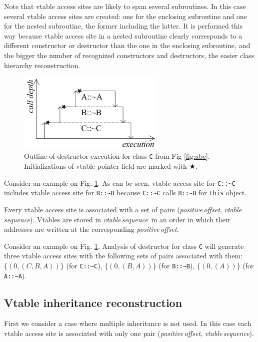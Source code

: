 \documentclass[times, 10pt,twocolumn]{article}
\newcommand{\offset}{\textit{offset}}
\newcommand{\vtable}{\textit{vtable}}
\newcommand{\positive}{\textit{positive}}
\newcommand{\sequence}{\textit{sequence}}
\renewcommand{\~}{{\raise.35ex\hbox{$\scriptstyle\sim$}}}
\begin{document}
Note that vtable access sites are likely to span several subroutines. In this
case several vtable access sites are created: one for the
enclosing subroutine and one for the nested subroutine, the former including the latter.
It is performed this way because vtable access site in a nested
subroutine clearly corresponds to a different constructor or destructor than the one
in the enclosing subroutine, 
and the bigger the number of recognized constructors and destructors, the easier class
hierarchy reconstruction.

\begin{figure}[tb!]
\centering
  \includegraphics[width=7.0cm]{images/dtor}
\caption{Outline of destructor execution for class  \lstinline{C} from Fig \ref{fig:abc}.
Initializations of vtable pointer field are marked with $\bigstar$.}
\label{fig:dtor}
\end{figure}

Consider an example on Fig. \ref{fig:dtor}.
As can be seen, vtable access site for \lstinline{C::~C} includes vtable
access site for \lstinline{B::~B} because \lstinline{C::~C} calls
\lstinline{B::~B} for \lstinline{this} object.

Every vtable access site is associated with
a set of pairs (\positive\,\offset, \vtable\,\sequence).
Vtables are stored in \vtable\,\sequence~in an order in which their addresses
are written at the corresponding \positive\,\offset.

Consider an example on Fig. \ref{fig:dtor}.
Analysis of destructor for class \lstinline{C} will generate three vtable access sites
with the following sets of pairs associated with them:
$\{(0, (C, B, A))\}$ (for \lstinline{C::~C}),
$\{(0, (B, A))\}$ (for \lstinline{B::~B}),
$\{(0, (A))\}$ (for \lstinline{A::~A}).




\quad
\subsection{Vtable inheritance reconstruction}
First we consider a case where multiple inheritance is not used.
In this case each vtable access site is associated with only
one pair (\positive\,\offset, \vtable\,\sequence).
\end{document}
